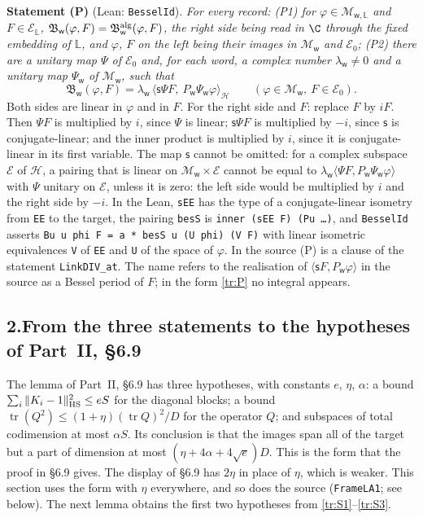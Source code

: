 \documentclass[11pt,letterpaper]{article}
\begin{document}
\textbf{Statement (P)} (Lean: \texttt{BesselId}). \emph{For every record: \textup{(P1)} for
$\varphi\in\mathcal M_{\mathsf w,\mathbb L}$ and $F\in\mathcal E_{\mathbb L}$,
$\mathfrak B_{\mathsf w}(\varphi,F)=\mathfrak B^{\rm alg}_{\mathsf w}(\varphi,F)$, the right side being
read in $\C$ through the fixed embedding of $\mathbb L$, and $\varphi$, $F$ on the left being their images in
$\mathcal M_{\mathsf w}$ and $\mathcal E_0$; \textup{(P2)} there are a unitary map $\Psi$ of
$\mathcal E_0$ and, for each word, a complex number $\lambda_{\mathsf w}\ne0$ and a unitary map
$\Psi_{\mathsf w}$ of $\mathcal M_{\mathsf w}$, such that}
\begin{equation}\label{tr:P}
 \mathfrak B_{\mathsf w}(\varphi,F)=\lambda_{\mathsf w}\,\big\langle \mathsf s\Psi F,\ P_{\mathsf w}\Psi_{\mathsf w}\varphi\big\rangle_{\mathcal H}
 \qquad(\varphi\in\mathcal M_{\mathsf w},\ F\in\mathcal E_0).
\end{equation}
Both sides are linear in $\varphi$ and in $F$. For the right side and $F$: replace $F$ by $iF$. Then
$\Psi F$ is multiplied by $i$, since $\Psi$ is linear; $\mathsf s\Psi F$ is multiplied by $-i$, since
$\mathsf s$ is conjugate-linear; and the inner product is multiplied by $i$, since it is conjugate-linear in
its first variable. The map $\mathsf s$ cannot be omitted: for a complex subspace $\mathcal E$ of $\mathcal H$,
a pairing that is linear on $\mathcal M_{\mathsf w}\times\mathcal E$ cannot be equal to
$\lambda_{\mathsf w}\langle\Psi F,P_{\mathsf w}\Psi_{\mathsf w}\varphi\rangle$ with $\Psi$ unitary on $\mathcal E$, unless it is zero: the left side
would be multiplied by $i$ and the right side by $-i$. In the Lean, \texttt{sEE} has the type of a
conjugate-linear isometry from \texttt{EE} to the target, the pairing \texttt{besS} is
\texttt{inner (sEE F) (Pu \dots)}, and \texttt{BesselId} asserts
\texttt{Bu u phi F = a * besS u (U phi) (V F)} with linear isometric equivalences \texttt{V} of \texttt{EE} and
\texttt{U} of the space of $\varphi$. In the source (P) is a clause of the statement \texttt{LinkDIV\_at}. The
name refers to the realisation of $\langle\mathsf sF,P_{\mathsf w}\varphi\rangle$ in the source as a Bessel period
of $F$; in the form \eqref{tr:P} no integral appears.

\subsection*{2.\quad From the three statements to the hypotheses of Part~II, \S6.9}

The lemma of Part~II, \S6.9 has three hypotheses, with constants $e$, $\eta$, $\alpha$: a bound
$\sum_i\|K_i-1\|_{\rm HS}^2\le eS$ for the diagonal blocks; a bound
$\operatorname{tr}(Q^2)\le(1+\eta)(\operatorname{tr}Q)^2/D$ for the operator $Q$; and subspaces of total
codimension at most $\alpha S$. Its conclusion is that the images span all of the target but a part of
dimension at most $(\eta+4\alpha+4\sqrt e)D$. This is the form that the proof in \S6.9 gives. The display of
\S6.9 has $2\eta$ in place of $\eta$, which is weaker. This section uses the form with $\eta$ everywhere, and
so does the source (\texttt{FrameLA1}; see below). The next lemma obtains the first two hypotheses from \eqref{tr:S1}--\eqref{tr:S3}.
\end{document}
